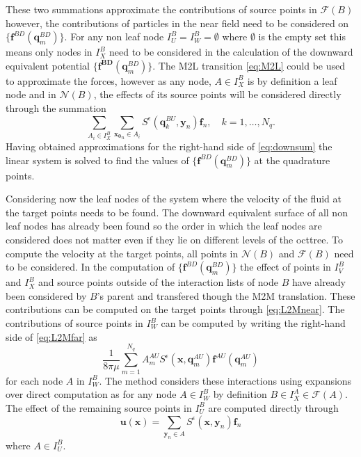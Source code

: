 These two summations approximate the contributions of source points in $\mathcal{F}(B)$ however, the contributions of particles in the near field need to be considered on $\{\bm{f}^{B D}(\bm{q}^{BD}_m)\}$. For any non leaf node $I_U^B = I_W^B = \emptyset$ where $\emptyset$ is the empty set this means only nodes in $I_X^B$ need to be considered in the calculation of the downward equivalent potential $\{\bm{f^{BD}}(\bm{q}^{BD}_m)\}$. The M2L transition \cref{eq:M2L} could be used to approximate the forces, however as any node, $A \in I_X^B$ is by definition a leaf node and in $\mathcal{N}(B)$, the effects of its source points will be considered directly through the summation
\begin{equation}
\label{eq:X}
    \sum_{A_i \in I_X^B} \sum_{{\bm{x_0}}_n\in A_i} S^\epsilon\left(\bm{q}^{BU}_{k}, {\bm{y}}_{n}\right) {\bm{f}}_{n}, \quad k=1,\dots,N_q.
\end{equation}
Having obtained approximations for the right-hand side of \cref{eq:downsum} the linear system is solved to find the values of $\{\bm{f}^{BD}(\bm{q}^{BD}_m)\}$ at the quadrature points.

Considering now the leaf nodes of the system where the velocity of the fluid at the target points needs to be found. The downward equivalent surface of all non leaf nodes has already been found so the order in which the leaf nodes are considered does not matter even if they lie on different levels of the octtree. To compute the velocity at the target points, all points in $\mathcal{N}(B)$ and $\mathcal{F}(B)$ need to be considered. In the computation of $\{\bm{f}^{BD}(\bm{q}^{BD}_m)\}$ the effect of points in $I_V^B$ and $I_X^B$ and source points outside of the interaction lists of node $B$ have already been considered by $B$'s parent and transfered though the M2M translation. These contributions can be computed on the target points through \cref{eq:L2Mnear}. The contributions of source points in $I_W^B$ can be computed by writing the right-hand side of \cref{eq:L2Mfar} as
\begin{equation}
\label{eq:W}
    \frac{1}{8 \pi \mu} \sum_{m=1}^{N_{q}} A_{m}^{AU} S^\epsilon\left(\bm{x}, \bm{q}_{m}^{A U}\right) \bm{f}^{A U}\left(\bm{q}_{m}^{A U}\right)
\end{equation}
for each node $A$ in $I_W^B$. The method considers these interactions using expansions over direct computation as for any node $A \in I_W^B$ by definition $B \in I_X^A \in \mathcal{F}(A)$. The effect of the remaining source points in $I_U^B$ are computed directly through
\begin{equation}
\label{eq:U}
    \bm{u}(\bm{x}) = \sum_{{\bm{y}}_n\in A} S^\epsilon(\bm{x},{\bm{y}}_n){\bm{f}}_n
\end{equation}
where $A \in I_U^B$.

